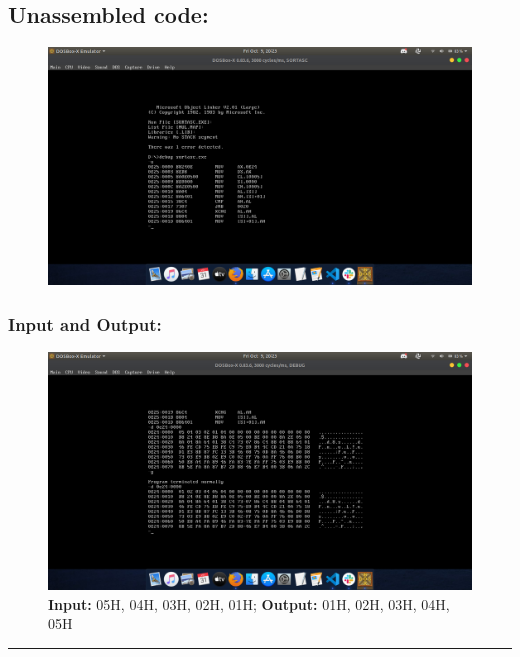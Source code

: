 \documentclass[10pt,a4paper]{article}
\begin{document}
\begin{flushleft}
\subsection*{\textbf{Unassembled code:}}
\begin{figure}[h]
    \centering
    \includegraphics[trim = 100mm 60mm 200mm 120mm, clip, width = \textwidth]{Pics/SAUS.png}
\end{figure}
\subsubsection*{\textbf{Input and Output:}}
\begin{figure}[h]
    \centering
    \includegraphics[trim = 100mm 60mm 100mm 80mm, clip, width = \textwidth]{Pics/SAIO.png}
    \caption{ \textbf{Input:} 05H, 04H, 03H, 02H, 01H; \newline \hspace{1cm}
              \textbf{Output:} 01H, 02H, 03H, 04H, 05H}
\end{figure}
\hrule
\newpage

\end{flushleft}
\end{document}
